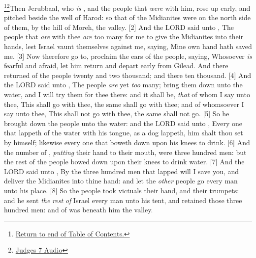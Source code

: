 \footnote{\textcolor[rgb]{0.00,0.25,0.00}{\hyperlink{JudgesTOC}{Return to end of Table of Contents.}}}\footnote{\href{https://audiobible.com/bible/judges_7.html}{\textcolor[cmyk]{0.99998,1,0,0}{Judges 7 Audio}}}\textcolor[cmyk]{0.99998,1,0,0}{Then Jerubbaal, who \emph{is} , and  the people that \emph{were} with him, rose up early, and pitched beside the well of Harod: so that  of the Midianites were on the north side of them, by the hill of Moreh,  the valley.}
[2] \textcolor[cmyk]{0.99998,1,0,0}{And the LORD said unto , The people that \emph{are} with thee \emph{are} too many for me to give the Midianites into their hands, lest Israel vaunt themselves against me, saying, Mine own hand hath saved me.}
[3] \textcolor[cmyk]{0.99998,1,0,0}{Now therefore go to, proclaim  the ears of the people, saying, Whosoever \emph{is} fearful and afraid, let him return and depart early from  Gilead. And there returned of the people twenty and two thousand; and there  ten thousand.}
[4] \textcolor[cmyk]{0.99998,1,0,0}{And the LORD said unto , The people \emph{are} yet \emph{too} many; bring them down unto the water, and I will try them for thee there: and it shall be, \emph{that} of whom I say unto thee, This shall go with thee, the same shall go with thee; and of whomsoever I say unto thee, This shall not go with thee, the same shall not go.}
[5] \textcolor[cmyk]{0.99998,1,0,0}{So he brought down the people unto the water: and the LORD said unto , Every one that lappeth of the water with his tongue, as a dog lappeth, him shalt thou set by himself; likewise every one that boweth down upon his knees to drink.}
[6] \textcolor[cmyk]{0.99998,1,0,0}{And the number of , \emph{putting} their hand to their mouth, were three hundred men: but  the rest of the people bowed down upon their knees to drink water.}
[7] \textcolor[cmyk]{0.99998,1,0,0}{And the LORD said unto , By the three hundred men that lapped will I save you, and deliver the Midianites into thine hand: and let  the \emph{other} people go every man unto his place.}
[8] \textcolor[cmyk]{0.99998,1,0,0}{So the people took victuals  their hand, and their trumpets: and he sent  \emph{the} \emph{rest} \emph{of} Israel every man unto his tent, and retained those three hundred men: and  of  was beneath him  the valley.}\\
